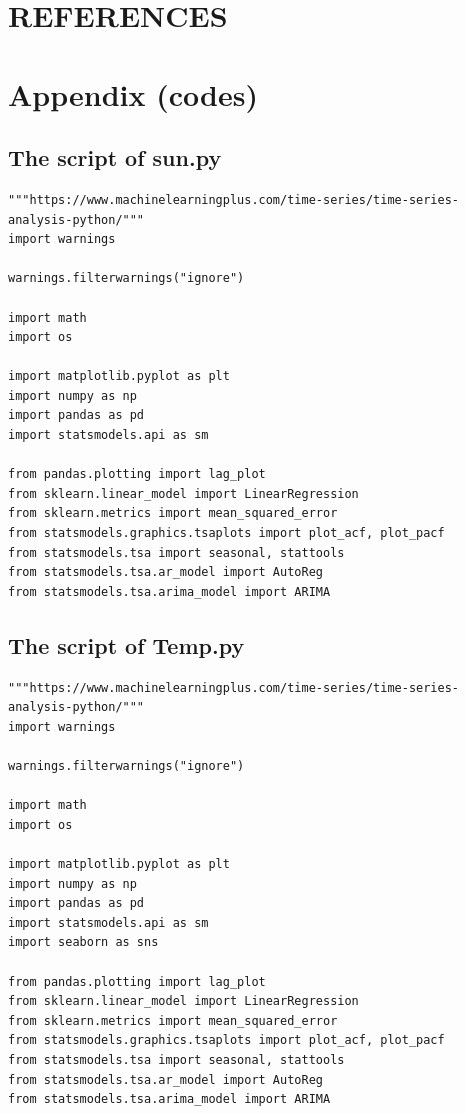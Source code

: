 \documentclass[12pt]{article}
\begin{document}
\newpage
\section*{REFERENCES}
\label{sec:sec6}
\printbibliography[heading=none]

%


\newpage
\section*{Appendix (codes)}
\subsection*{The script of sun.py}

\begin{lstlisting}
"""https://www.machinelearningplus.com/time-series/time-series-analysis-python/"""
import warnings

warnings.filterwarnings("ignore")

import math
import os

import matplotlib.pyplot as plt
import numpy as np
import pandas as pd
import statsmodels.api as sm

from pandas.plotting import lag_plot
from sklearn.linear_model import LinearRegression
from sklearn.metrics import mean_squared_error
from statsmodels.graphics.tsaplots import plot_acf, plot_pacf
from statsmodels.tsa import seasonal, stattools
from statsmodels.tsa.ar_model import AutoReg
from statsmodels.tsa.arima_model import ARIMA

\end{lstlisting}
\subsection*{The script of Temp.py}
\begin{lstlisting}
"""https://www.machinelearningplus.com/time-series/time-series-analysis-python/"""
import warnings

warnings.filterwarnings("ignore")

import math
import os

import matplotlib.pyplot as plt
import numpy as np
import pandas as pd
import statsmodels.api as sm
import seaborn as sns

from pandas.plotting import lag_plot
from sklearn.linear_model import LinearRegression
from sklearn.metrics import mean_squared_error
from statsmodels.graphics.tsaplots import plot_acf, plot_pacf
from statsmodels.tsa import seasonal, stattools
from statsmodels.tsa.ar_model import AutoReg
from statsmodels.tsa.arima_model import ARIMA


\end{lstlisting}
\end{document}
